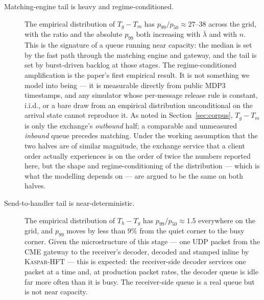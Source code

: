 \documentclass[11pt]{article}
\newcommand{\kasparhft}{\textsc{Kaspar-HFT}}
\begin{document}
\begin{description}
\item[Matching-engine tail is heavy and regime-conditioned.] The empirical distribution of $T_g - T_m$ has $p_{99}/p_{50} \approx 27$--$38$ across the grid, with the ratio and the absolute $p_{99}$ both increasing with $\bar\lambda$ and with $n$. This is the signature of a queue running near capacity: the median is set by the fast path through the matching engine and gateway, and the tail is set by burst-driven backlog at those stages. The regime-conditioned amplification is the paper's first empirical result. It is not something we model into being --- it is measurable directly from public MDP3 timestamps, and any simulator whose per-message release rule is constant, i.i.d., or a bare draw from an empirical distribution unconditional on the arrival state cannot reproduce it. As noted in Section~\ref{sec:corpus}, $T_g - T_m$ is only the exchange's \emph{outbound} half; a comparable and unmeasured \emph{inbound} queue precedes matching. Under the working assumption that the two halves are of similar magnitude, the exchange service that a client order actually experiences is on the order of twice the numbers reported here, but the shape and regime-conditioning of the distribution --- which is what the modelling depends on --- are argued to be the same on both halves.

\item[Send-to-handler tail is near-deterministic.] The empirical distribution of $T_h - T_g$ has $p_{99}/p_{50} \approx 1.5$ everywhere on the grid, and $p_{99}$ moves by less than $9\%$ from the quiet corner to the busy corner. Given the microstructure of this stage --- one UDP packet from the CME gateway to the receiver's decoder, decoded and stamped inline by \kasparhft{} \citep{mayeski_actorhft} --- this is expected: the receiver-side decoder services one packet at a time and, at production packet rates, the decoder queue is idle far more often than it is busy. The receiver-side queue is a real queue but is not near capacity.


\end{description}
\end{document}
